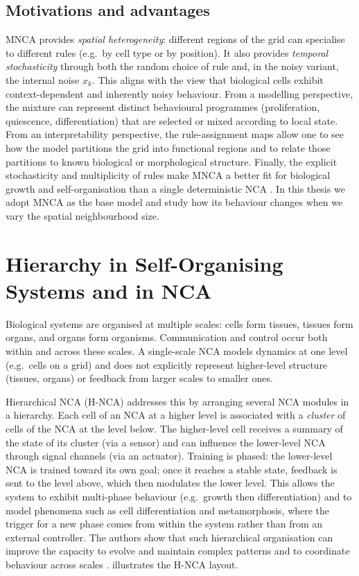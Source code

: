 \subsection{Motivations and advantages}

MNCA provides \emph{spatial heterogeneity}: different regions of the grid can specialise to different rules (e.g.\ by cell type or by position). It also provides \emph{temporal stochasticity} through both the random choice of rule and, in the noisy variant, the internal noise \(x_k\). This aligns with the view that biological cells exhibit context-dependent and inherently noisy behaviour. From a modelling perspective, the mixture can represent distinct behavioural programmes (proliferation, quiescence, differentiation) that are selected or mixed according to local state. From an interpretability perspective, the rule-assignment maps allow one to see how the model partitions the grid into functional regions and to relate those partitions to known biological or morphological structure. Finally, the explicit stochasticity and multiplicity of rules make MNCA a better fit for biological growth and self-organisation than a single deterministic NCA \cite{mnca_milite2025}. In this thesis we adopt MNCA as the base model and study how its behaviour changes when we vary the spatial neighbourhood size.

\section{Hierarchy in Self-Organising Systems and in NCA}
\label{sec:sota:hierarchy}

Biological systems are organised at multiple scales: cells form tissues, tissues form organs, and organs form organisms. Communication and control occur both within and across these scales. A single-scale NCA models dynamics at one level (e.g.\ cells on a grid) and does not explicitly represent higher-level structure (tissues, organs) or feedback from larger scales to smaller ones.

Hierarchical NCA (H-NCA) \cite{hnca_pande2023} addresses this by arranging several NCA modules in a hierarchy. Each cell of an NCA at a higher level is associated with a \emph{cluster} of cells of the NCA at the level below. The higher-level cell receives a summary of the state of its cluster (via a sensor) and can influence the lower-level NCA through signal channels (via an actuator). Training is phased: the lower-level NCA is trained toward its own goal; once it reaches a stable state, feedback is sent to the level above, which then modulates the lower level. This allows the system to exhibit multi-phase behaviour (e.g.\ growth then differentiation) and to model phenomena such as cell differentiation and metamorphosis, where the trigger for a new phase comes from within the system rather than from an external controller. The authors show that such hierarchical organisation can improve the capacity to evolve and maintain complex patterns and to coordinate behaviour across scales \cite{hnca_pande2023}.  illustrates the H-NCA layout.


